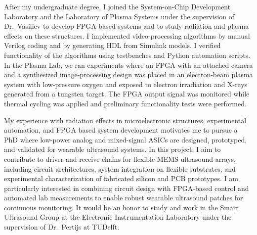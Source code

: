 \documentclass[a4paper,12pt]{article}
\begin{document}
\vspace{10pt}
After my undergraduate degree, I joined the System-on-Chip Development Laboratory and the Laboratory of Plasma Systems under the supervision of Dr.\ Vasiliev to develop FPGA-based systems and to study radiation and plasma effects on these structures. I implemented video-processing algorithms by manual Verilog coding and by generating HDL from Simulink models. I verified functionality of the algorithms using testbenches and Python automation scripts. In the Plasma Lab, we ran experiments where an FPGA with an attached camera and a synthesized image-processing design was placed in an electron-beam plasma system with low-pressure oxygen and exposed to electron irradiation and X-rays generated from a tungsten target. The FPGA output signal was monitored while thermal cycling was applied and preliminary functionality tests were performed. 

\vspace{10pt}
My experience with radiation effects in microelectronic structures, experimental automation, and FPGA based system development motivates me to pursue a PhD where low-power analog and mixed-signal ASICs are designed, prototyped, and validated for wearable ultrasound systems. In this project, I aim to contribute to driver and receive chains for flexible MEMS ultrasound arrays, including circuit architectures, system integration on flexible substrates, and experimental characterization of fabricated silicon and PCB prototypes. I am particularly interested in combining circuit design with FPGA-based control and automated lab measurements to enable robust wearable ultrasound patches for continuous monitoring. It would be an honor to study and work in the Smart Ultrasound Group at the Electronic Instrumentation Laboratory under the supervision of Dr.\ Pertijs at TUDelft.
\end{document}

